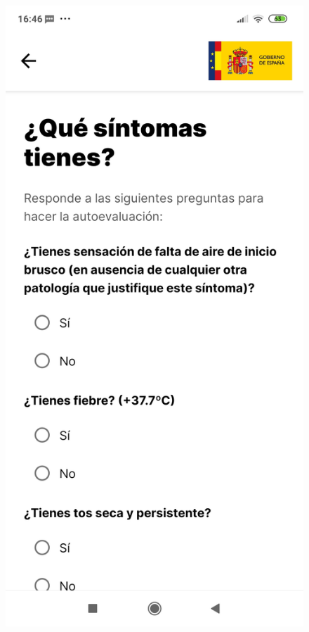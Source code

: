 \documentclass[a4paper, 12pt]{article}
\begin{document}
\begin{figure}[!htb]
\begin{minipage}{0.33\textwidth}
   \end{minipage}\hfill
   \begin{minipage}{0.33\textwidth}
     \centering
     \includegraphics[scale=0.06]{images/discussion/asistencia-covid-2.jpg}

\end{minipage}
\end{figure}
\end{document}
